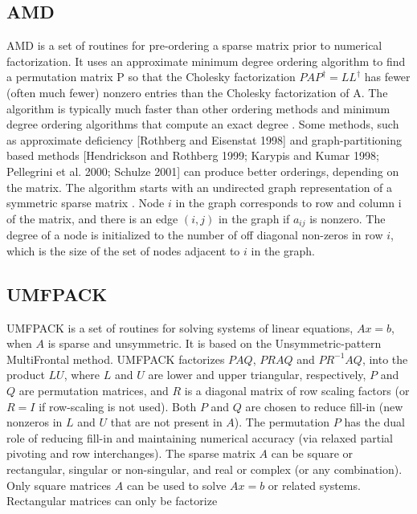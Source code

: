 \subsection{AMD}
AMD is a set of routines for pre-ordering a sparse matrix prior to numerical factorization. It uses an approximate minimum degree ordering algorithm to find a permutation matrix P so that the Cholesky factorization $PAP^\dag =LL^\dag$ has fewer (often much fewer) nonzero entries than the Cholesky factorization of A. The algorithm is typically much faster than other ordering methods and minimum degree ordering algorithms that compute an exact degree . Some methods, such as approximate deficiency [Rothberg and Eisenstat 1998] and graph-partitioning based methods [Hendrickson and Rothberg 1999; Karypis and Kumar 1998; Pellegrini et al. 2000; Schulze 2001] can produce better orderings, depending on the matrix. The algorithm starts with an undirected graph representation of a symmetric sparse matrix . Node $i$ in the graph corresponds to row and column i of the matrix, and there is an edge $(i,j)$ in the graph if $a_{ij}$ is nonzero. The degree of a node is initialized to the number of off diagonal non-zeros in row $i$, which is the size of the set of nodes adjacent to $i$ in the graph.

\subsection{UMFPACK}
UMFPACK is a set of routines for solving systems of linear equations, $Ax = b$, when $A$ is sparse and unsymmetric. It is based on the Unsymmetric-pattern MultiFrontal method. UMFPACK factorizes $PAQ$, $PRAQ$ and $PR^{-1}AQ$, into the product $LU$, where $L$ and $U$ are lower and upper triangular, respectively, $P$ and $Q$ are permutation matrices, and $R$ is a diagonal matrix of row scaling factors (or $R = I$ if row-scaling is not used). Both $P$ and $Q$ are chosen to reduce fill-in (new nonzeros in $L$ and $U$ that are not present in $A$). The permutation $P$ has the dual role of reducing fill-in and maintaining numerical accuracy (via relaxed partial pivoting and row interchanges). The sparse matrix $A$ can be square or rectangular, singular or non-singular, and real or complex (or any combination). Only square matrices $A$ can be used to solve $Ax = b$ or related systems. Rectangular matrices can only be factorize 